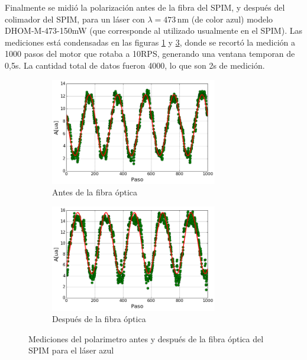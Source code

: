 Finalmente se midió la polarización antes de la fibra del SPIM, y después del colimador del SPIM, para un láser con $\lambda = 473\,$nm (de color azul) modelo DHOM-M-473-150mW (que corresponde al utilizado usualmente en el SPIM). Las mediciones está condensadas en las figuras \ref{fig:polarimetro/polarizacion_laser} y \ref{fig:polarimetro/polarizacion_fibra}, donde se recortó la medición a 1000 pasos del motor que rotaba a 10RPS, generando una ventana temporan de 0,5s. La cantidad total de datos fueron 4000, lo que son 2s de medición.

\begin{figure}[H]
    \begin{subfigure}[b]{0.5\textwidth}
        \centering
        \includegraphics[width=0.8\textwidth]{fig/polarimetro/polarizacion_laser}
        \caption{Antes de la fibra óptica}
        \label{fig:polarimetro/polarizacion_laser}
    \end{subfigure}
    \begin{subfigure}[b]{0.5\textwidth}
        \centering
        \includegraphics[width=0.8\textwidth]{fig/polarimetro/polarizacion_fibra}
        \caption{Después de la fibra óptica}
        \label{fig:polarimetro/polarizacion_fibra}
    \end{subfigure}
    \caption{Mediciones del polarimetro antes y después de la fibra óptica del SPIM para el láser azul}
\end{figure}

